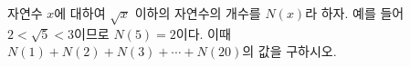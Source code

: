 자연수 $x$에 대하여 $\sqrt{x}$ 이하의 자연수의 개수를 $N(x)$라 하자. 예를 들어 $2<\sqrt{5}<3$이므로 $N(5)=2$이다. 이때 $N(1)+N(2)+N(3)+\cdots+N(20)$의 값을 구하시오.
